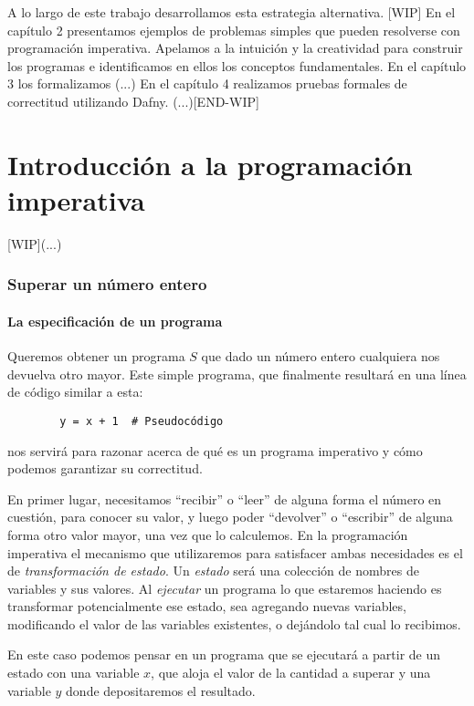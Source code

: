 \documentclass[12pt, a4paper, openany, fleqn]{book}
\begin{document}
    A lo largo de este trabajo desarrollamos esta estrategia alternativa.
    [WIP]
    En el capítulo 2 presentamos ejemplos de problemas simples que pueden resolverse con programación imperativa. Apelamos a la intuición y la creatividad para construir los programas e identificamos en ellos los conceptos fundamentales.
    En el capítulo 3 los formalizamos (...)
    En el capítulo 4 realizamos pruebas formales de correctitud utilizando Dafny. (...)[END-WIP]

    \chapter{Introducción a la programación imperativa}
    [WIP](...)

    \subsection{Superar un número entero}
    \subsubsection*{La especificación de un programa}

    Queremos obtener un programa $S$ que dado un número entero cualquiera nos devuelva otro mayor. Este simple programa, que finalmente resultará en una línea de código similar a esta:
    \begin{verbatim}
        y = x + 1  # Pseudocódigo
    \end{verbatim}
    nos servirá para razonar acerca de qué es un programa imperativo y cómo podemos garantizar su correctitud.

    En primer lugar, necesitamos ``recibir'' o ``leer'' de alguna forma el número en cuestión, para conocer su valor, y luego poder ``devolver'' o ``escribir'' de alguna forma otro valor mayor, una vez que lo calculemos.
    En la programación imperativa el mecanismo que utilizaremos para satisfacer ambas necesidades es el de \textit{transformación de estado}.
    Un \textit{estado} será una colección de nombres de variables y sus valores. Al \textit{ejecutar} un programa lo que estaremos haciendo es transformar potencialmente ese estado, sea agregando nuevas variables, modificando el valor de las variables existentes, o dejándolo tal cual lo recibimos.

    En este caso podemos pensar en un programa que se ejecutará a partir de un estado con una variable $x$, que aloja el valor de la cantidad a superar y una variable $y$ donde depositaremos el resultado.
\end{document}

